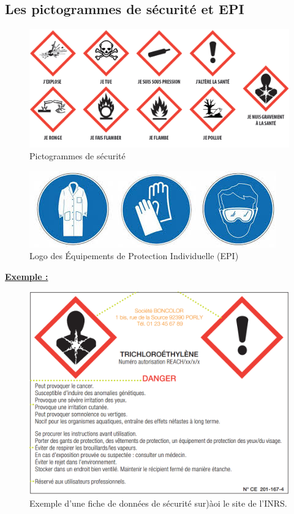 \subsection{Les pictogrammes de sécurité et EPI}
\begin{figure}[!h]
    \centering
    \includegraphics[scale=1]{Images/Fiche_Methode1/Pictogrammes.png}
    \caption{Pictogrammes de sécurité}
    \label{fig:enter-label}
\end{figure}

\begin{figure}[!h]
    \centering
    \includegraphics[scale=0.9]{Images/Fiche_Methode1/picto_gant_blouse_lunette.jpg}
    \caption{Logo des \'{E}quipements de Protection Individuelle (EPI)}
    \label{fig:enter-label}
\end{figure}


\underline{\textbf{Exemple :}}
\begin{figure}[!h]
    \centering
    \includegraphics[scale=0.7]{Images/Fiche_Methode1/Exemple_fiche_toxico.png}
    \caption{Exemple d'une fiche de données de sécurité sur)àoi le site de l'INRS.}
    \label{fig:enter-label}
\end{figure}

